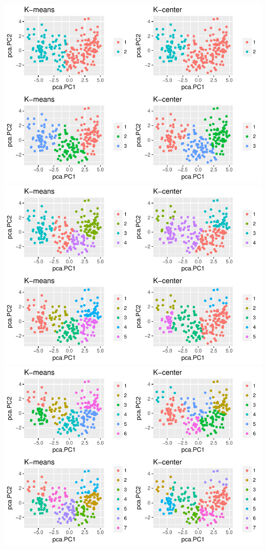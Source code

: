 \documentclass[]{article}
\begin{document}
\includegraphics{Project2_files/figure-latex/unnamed-chunk-5-1.pdf}
\includegraphics{Project2_files/figure-latex/unnamed-chunk-5-2.pdf}
\includegraphics{Project2_files/figure-latex/unnamed-chunk-5-3.pdf}
\end{document}
